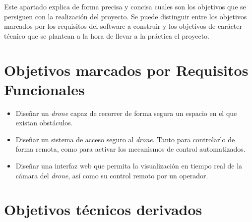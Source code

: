 
Este apartado explica de forma precisa y concisa cuales son los objetivos que se persiguen con la realización del proyecto. Se puede distinguir entre los objetivos marcados por los requisitos del software a construir y los objetivos de carácter técnico que se plantean a la hora de llevar a la práctica el proyecto.

\section{Objetivos marcados por Requisitos Funcionales}

\begin{itemize}
\item Diseñar un \emph{drone} capaz de recorrer de forma segura un espacio en el que existan obstáculos.
\item Diseñar un sistema de acceso seguro al \emph{drone}. Tanto para controlarlo de forma remota, como para activar los mecanismos de control automatizados.
\item Diseñar una interfaz web que permita la visualización en tiempo real de la cámara del \emph{drone}, así como su control remoto por un operador.
\end{itemize}


\section{Objetivos técnicos derivados}

